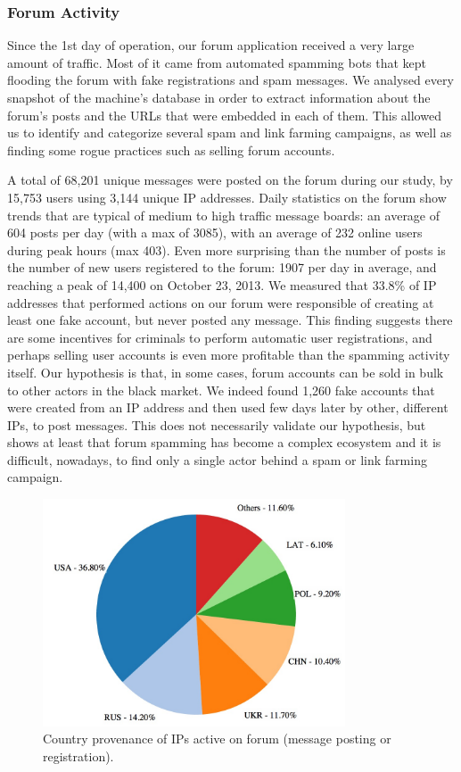 \subsubsection{Forum Activity}

Since the 1st day of operation, our forum application received a very large amount of traffic. Most of it came from automated spamming bots that kept flooding the forum with fake registrations and spam messages. We analysed every snapshot of the machine's database in order to extract information about the forum's posts and the URLs that were embedded in each of them. This allowed us to identify and categorize several spam and link farming campaigns, as well as finding some rogue practices such as selling forum accounts.

A total of 68,201 unique messages were posted on the forum during our study, by 15,753 users using 3,144 unique IP addresses. Daily statistics on the forum show trends that are typical of medium to high traffic message boards: an average of 604 posts per day (with a max of 3085), with an average of 232 online users during peak hours (max 403).
Even more surprising than the number of posts is the number of new users registered to the forum: 1907 per day in average, and reaching a peak of 14,400 on October 23, 2013. We measured that 33.8\% of IP addresses that performed actions on our forum were responsible of creating at least one fake account, but never posted any message. This finding suggests there are some incentives for criminals to perform automatic user registrations, and perhaps selling user accounts is even more profitable than the spamming activity itself. Our hypothesis is that, in some cases, forum accounts can be sold in bulk to other actors in the black market. We indeed found 1,260 fake accounts that were created from an IP address and then used few days later by other, different IPs, to post messages. This does not necessarily validate our hypothesis, but shows at least that forum spamming has become a complex ecosystem and it is difficult, nowadays, to find only a single actor behind a spam or link farming campaign.

\begin{figure}[tbh]
\centerline{\includegraphics[width=0.8\textwidth]{Images/spamCountriesIP.jpg}}
\caption{Country provenance of IPs active on forum (message posting or registration).\label{fig:spamCountriesIP}}
\end{figure}

